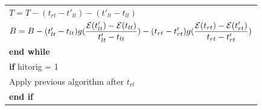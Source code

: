 \begin{table}
\begin{minipage}[b]{8cm}
\begin{tabular}{p{7cm}}
\\
\hspace{4mm} $T = T - (t_{rt}-t'_{lt}) - (t'_{lt} - t_{lt})$
\\
\hspace{4mm}$B = B -  (t'_{lt}-t_{lt})g(\dfrac{\mathcal{E}(t'_{lt})-\mathcal{E}(t_{lt})}{t'_{lt}-t_{lt}}) - (t_{rt}-t'_{rt})g(\dfrac{\mathcal{E}(t_{rt})-\mathcal{E}(t'_{rt})}{t_{rt}-t'_{rt}})$
\\
\textbf{end while}
\\
\textbf{if} hitorig = 1
\\
\hspace{4mm}
Apply previous algorithm after $t_{rt}$
\\
\textbf{end if}
\end{tabular}
\end{minipage}
\end{table}
